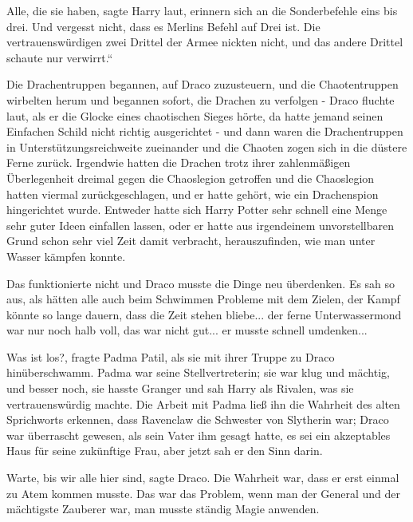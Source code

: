 \glqq{}Alle, die sie haben\grqq{}, sagte Harry laut, \glqq{}erinnern sich an die
Sonderbefehle eins bis drei. Und vergesst nicht, dass es Merlins Befehl auf Drei
ist. \glqq{}Die vertrauenswürdigen zwei Drittel der Armee nickten nicht, und das
andere Drittel schaute nur verwirrt.“

Die Drachentruppen begannen, auf Draco zuzusteuern, und die Chaotentruppen
wirbelten herum und begannen sofort, die Drachen zu verfolgen - Draco fluchte
laut, als er die Glocke eines chaotischen Sieges hörte, da hatte jemand seinen
Einfachen Schild nicht richtig ausgerichtet - und dann waren die Drachentruppen
in Unterstützungsreichweite zueinander und die Chaoten zogen sich in die düstere
Ferne zurück. Irgendwie hatten die Drachen trotz ihrer zahlenmäßigen
Überlegenheit dreimal gegen die Chaoslegion getroffen und die Chaoslegion hatten
viermal zurückgeschlagen, und er hatte gehört, wie ein Drachenspion hingerichtet
wurde. Entweder hatte sich Harry Potter sehr schnell eine Menge sehr guter Ideen
einfallen lassen, oder er hatte aus irgendeinem unvorstellbaren Grund schon sehr
viel Zeit damit verbracht, herauszufinden, wie man unter Wasser kämpfen konnte.

Das funktionierte nicht und Draco musste die Dinge neu überdenken. Es sah so
aus, als hätten alle auch beim Schwimmen Probleme mit dem Zielen, der Kampf
könnte so lange dauern, dass die Zeit stehen bliebe... der ferne Unterwassermond
war nur noch halb voll, das war nicht gut... er musste schnell umdenken...

\glqq{}Was ist los?\grqq{}, fragte Padma Patil, als sie mit ihrer Truppe zu Draco
hinüberschwamm. Padma war seine Stellvertreterin; sie war klug und mächtig, und
besser noch, sie hasste Granger und sah Harry als Rivalen, was sie
vertrauenswürdig machte. Die Arbeit mit Padma ließ ihn die Wahrheit des alten
Sprichworts erkennen, dass Ravenclaw die Schwester von Slytherin war; Draco war
überrascht gewesen, als sein Vater ihm gesagt hatte, es sei ein akzeptables Haus
für seine zukünftige Frau, aber jetzt sah er den Sinn darin.

\glqq{}Warte, bis wir alle hier sind\grqq{}, sagte Draco. Die Wahrheit war, dass
er erst einmal zu Atem kommen musste. Das war das Problem, wenn man der General
und der mächtigste Zauberer war, man musste ständig Magie anwenden.

